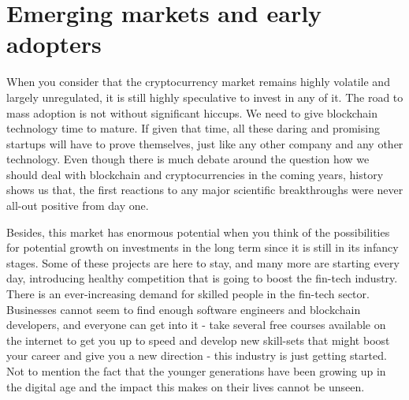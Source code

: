 \section{Emerging markets and early adopters}
When you consider that the cryptocurrency market remains highly volatile and largely unregulated, it is still highly speculative to invest in any of it. The road to mass adoption is not without significant hiccups. We need to give blockchain technology time to mature. If given that time, all these daring and promising startups will have to prove themselves, just like any other company and any other technology. Even though there is much debate around the question how we should deal with blockchain and cryptocurrencies in the coming years, history shows us that, the first reactions to any major scientific breakthroughs were never all-out positive from day one.\medskip

Besides, this market has enormous potential when you think of the possibilities for potential growth on investments in the long term since it is still in its infancy stages. Some of these projects are here to stay, and many more are starting every day, introducing healthy competition that is going to boost the fin-tech industry. There is an ever-increasing demand for skilled people in the fin-tech sector. Businesses cannot seem to find enough software engineers and blockchain developers, and everyone can get into it - take several free courses available on the internet to get you up to speed and develop new skill-sets that might boost your career and give you a new direction - this industry is just getting started. Not to mention the fact that the younger generations have been growing up in the digital age and the impact this makes on their lives cannot be unseen.\medskip

